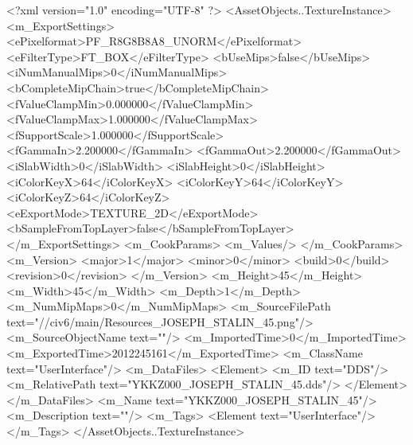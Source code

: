 <?xml version="1.0" encoding="UTF-8" ?>
<AssetObjects..TextureInstance>
	<m_ExportSettings>
		<ePixelformat>PF_R8G8B8A8_UNORM</ePixelformat>
		<eFilterType>FT_BOX</eFilterType>
		<bUseMips>false</bUseMips>
		<iNumManualMips>0</iNumManualMips>
		<bCompleteMipChain>true</bCompleteMipChain>
		<fValueClampMin>0.000000</fValueClampMin>
		<fValueClampMax>1.000000</fValueClampMax>
		<fSupportScale>1.000000</fSupportScale>
		<fGammaIn>2.200000</fGammaIn>
		<fGammaOut>2.200000</fGammaOut>
		<iSlabWidth>0</iSlabWidth>
		<iSlabHeight>0</iSlabHeight>
		<iColorKeyX>64</iColorKeyX>
		<iColorKeyY>64</iColorKeyY>
		<iColorKeyZ>64</iColorKeyZ>
		<eExportMode>TEXTURE_2D</eExportMode>
		<bSampleFromTopLayer>false</bSampleFromTopLayer>
	</m_ExportSettings>
	<m_CookParams>
		<m_Values/>
	</m_CookParams>
	<m_Version>
		<major>1</major>
		<minor>0</minor>
		<build>0</build>
		<revision>0</revision>
	</m_Version>
	<m_Height>45</m_Height>
	<m_Width>45</m_Width>
	<m_Depth>1</m_Depth>
	<m_NumMipMaps>0</m_NumMipMaps>
	<m_SourceFilePath text="//civ6/main/Resources_JOSEPH_STALIN_45.png"/>
	<m_SourceObjectName text=""/>
	<m_ImportedTime>0</m_ImportedTime>
	<m_ExportedTime>2012245161</m_ExportedTime>
	<m_ClassName text="UserInterface"/>
	<m_DataFiles>
		<Element>
			<m_ID text="DDS"/>
			<m_RelativePath text="YKKZ000_JOSEPH_STALIN_45.dds"/>
		</Element>
	</m_DataFiles>
	<m_Name text="YKKZ000_JOSEPH_STALIN_45"/>
	<m_Description text=""/>
	<m_Tags>
		<Element text="UserInterface"/>
	</m_Tags>
</AssetObjects..TextureInstance>

